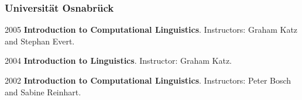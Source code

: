 \subsubsection*{Universit\"at Osnabr\"uck}
%
\begin{dated}
	\item[2005]  
		\textbf{Introduction to Computational Linguistics}. 
		Instructors: Graham Katz and Stephan Evert.
	\item[2004]
		\textbf{Introduction to Linguistics}. 
		Instructor: Graham Katz.
	\item[2002]
		\textbf{Introduction to Computational Linguistics}. 
		Instructors: Peter Bosch and Sabine Reinhart.
\end{dated}